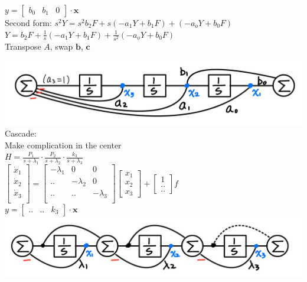 \documentclass[4pt]{article}
\theoremstyle{definition}
\theoremstyle{definition}
\begin{document}
\begin{landscape}
\begin{multicols}{3}
    \(y =
    \begin{bmatrix}
        b_0 & b_1 & 0      %
    \end{bmatrix}
    \cdot \mathbf x
    \)\\
    Second form: \(s^2 Y = s^2 b_2 F + s(-a_1 Y + b_1 F) + (-a_o Y + b_0 F)\)\\
    \(Y = b_2 F + \frac 1 s(-a_1 Y + b_1 F) + \frac 1 {s^2}(-a_o Y + b_0 F)\)\\
    Transpose $A$, swap $\mathbf b$, $\mathbf c$

    \includegraphics[width=\linewidth]{figures/canonical.jpg}
    Cascade:\\
    Make complication in the center\\
    \(H = \frac {P_1}{s+\lambda_1} \cdot \frac{P_2}{s+\lambda_2} \cdot \frac{k_3}{s+\lambda_3}\)\\
    \(
    \begin{bmatrix}
        \dot{x}_1\\
        \dot{x}_2\\
        \dot{x}_3\\
    \end{bmatrix}
    =
    \begin{bmatrix}
        -\lambda_1 & 0 & 0\\
        .. & -\lambda_2 & 0\\
        .. & .. & -\lambda_3\\     %
    \end{bmatrix}
    \begin{bmatrix}
        x_1\\
        x_2\\
        x_3
    \end{bmatrix}
    +
    \begin{bmatrix}
        1\\..\\..         %
    \end{bmatrix}
    f
    \)\\

    \(y =
    \begin{bmatrix}
        .. & .. & k_3       %
    \end{bmatrix}
    \cdot \mathbf x
    \)
    \includegraphics[width=\linewidth]{figures/cascade.jpg}


\end{multicols}
\end{landscape}
\end{document}
